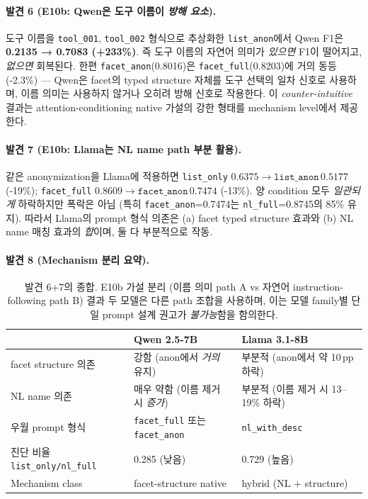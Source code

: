 \documentclass[11pt]{article}
\theoremstyle{plain}
\theoremstyle{definition}
\theoremstyle{remark}
\begin{document}
\paragraph{발견 6 (E10b: Qwen은 도구 이름이 \emph{방해 요소}).}
도구 이름을 \texttt{tool\_001}, \texttt{tool\_002} 형식으로 추상화한 \texttt{list\_anon}에서 Qwen F1은 \textbf{0.2135 → 0.7083 (+233\%)}. 즉 도구 이름의 자연어 의미가 \emph{있으면} F1이 떨어지고, \emph{없으면} 회복된다. 한편 \texttt{facet\_anon}(0.8016)은 \texttt{facet\_full}(0.8203)에 거의 동등 (-2.3\%) — Qwen은 facet의 typed structure 자체를 도구 선택의 일차 신호로 사용하며, 이름 의미는 사용하지 않거나 오히려 방해 신호로 작용한다. 이 \emph{counter-intuitive} 결과는 attention-conditioning native 가설의 강한 형태를 mechanism level에서 제공한다.

\paragraph{발견 7 (E10b: Llama는 NL name path 부분 활용).}
같은 anonymization을 Llama에 적용하면 \texttt{list\_only} $0.6375 \to \texttt{list\_anon}\,0.5177$ (-19\%); \texttt{facet\_full} $0.8609 \to \texttt{facet\_anon}\,0.7474$ (-13\%). 양 condition 모두 \emph{일관되게} 하락하지만 폭락은 아님 (특히 \texttt{facet\_anon}=0.7474는 \texttt{nl\_full}=0.8745의 85\% 유지). 따라서 Llama의 prompt 형식 의존은 (a) facet typed structure 효과와 (b) NL name 매칭 효과의 \emph{합}이며, 둘 다 부분적으로 작동.

\paragraph{발견 8 (Mechanism 분리 요약).}
\begin{table}[h]
\centering
\small
\begin{tabular}{lll}
\toprule
& Qwen 2.5-7B & Llama 3.1-8B \\
\midrule
facet structure 의존 & 강함 (anon에서 \emph{거의} 유지) & 부분적 (anon에서 약 10\,pp 하락) \\
NL name 의존         & 매우 약함 (이름 제거 시 \emph{증가}) & 부분적 (이름 제거 시 13--19\% 하락) \\
우월 prompt 형식      & \texttt{facet\_full} 또는 \texttt{facet\_anon} & \texttt{nl\_with\_desc} \\
진단 비율 \texttt{list\_only/nl\_full} & 0.285 (낮음) & 0.729 (높음) \\
Mechanism class       & facet-structure native & hybrid (NL + structure) \\
\bottomrule
\end{tabular}
\caption{발견 6+7의 종합. E10b 가설 분리 (이름 의미 path A vs 자연어 instruction-following path B) 결과 두 모델은 다른 path 조합을 사용하며, 이는 모델 family별 단일 prompt 설계 권고가 \emph{불가능}함을 함의한다.}
\label{tab:e10b-mechanism}
\end{table}
\end{document}
